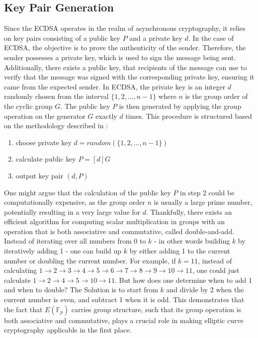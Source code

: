 \subsection{Key Pair Generation}\label{sec:keygen}
\label{subsection:keygen}
	Since the ECDSA operates in the realm of asynchronous cryptography, it relies on key pairs consisting of a public key $P$ and a private key $d$. In the case of ECDSA, the objective is to prove the authenticity of the sender. Therefore, the sender possesses a private key, which is used to sign the message being sent. Additionally, there exists a public key, that recipients of the message can use to verify that the message was signed with the corresponding private key, ensuring it came from the expected sender. In ECDSA, the private key is an integer $d$ randomly chosen from the interval $\{1,2,...,n-1\}$ where $n$ is the group order of the cyclic group $G$. The public key $P$ is then generated by applying the group operation on the generator $G$ exactly $d$ times. This procedure is structured based on the methodology described in \cite{9422589}:
	\begin{enumerate}
	\item choose private key $d = random(\{1,2,...,n-1\})$
	\item calculate public key $P = [d]G$
	\item output key pair $(d,P)$
	\end{enumerate}
One might argue that the calculation of the public key $P$ in step 2 could be computationally expensive, as the group order $n$ is usually a large prime number, potentially resulting in a very large value for $d$. Thankfully, there exists an efficient algorithm for computing scalar multiplication in groups with an operation that is both associative and commutative, called double-and-add. Instead of iterating over all numbers from $0$ to $k$ - in other words building $k$ by iteratively adding 1 - one can build up $k$ by either adding 1 to the current number or doubling the current number. For example, if $k = 11$, instead of calculating $1\to2\to3\to4\to5\to6\to7\to8\to9\to10\to11$, one could just calculate  $1\to2\to4\to5\to10\to11$. But how does one determine when to add 1 and when to double? The Solution is to start from $k$ and divide by 2 when the current number is even, and subtract 1 when it is odd\cite{10.1145/2996366.2996371}. This demonstrates that the fact that $E(\mathbb{F}_p)$ carries group structure, such that its group operation is both associative and commutative, plays a crucial role in making elliptic curve cryptography applicable in the first place.

